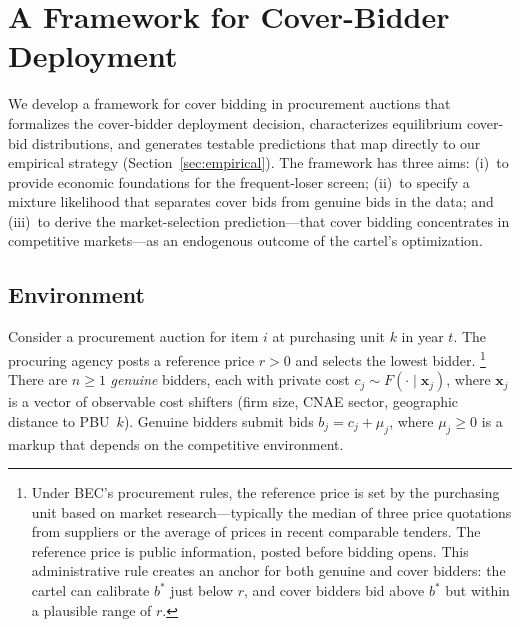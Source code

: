 
\section{A Framework for Cover-Bidder Deployment}
\label{sec:structural}

We develop a framework for cover bidding in procurement auctions
that formalizes the cover-bidder deployment decision, characterizes
equilibrium cover-bid distributions, and generates testable predictions
that map directly to our empirical strategy
(Section~\ref{sec:empirical}). The framework has three aims: (i)~to
provide economic foundations for the frequent-loser screen; (ii)~to
specify a mixture likelihood that separates cover bids from genuine bids
in the data; and (iii)~to derive the market-selection prediction---that
cover bidding concentrates in competitive markets---as an endogenous
outcome of the cartel's optimization.


\subsection{Environment}
\label{sec:environment}

Consider a procurement auction for item $i$ at purchasing unit $k$ in
year $t$. The procuring agency posts a reference price $r > 0$ and
selects the lowest bidder.%
\footnote{Under BEC's procurement rules, the reference price is %
set by the purchasing unit based on market research---typically
the median of three price quotations from suppliers or the
average of prices in recent comparable tenders. The reference
price is public information, posted before bidding opens. This
administrative rule creates an anchor for both genuine and
cover bidders: the cartel can calibrate $b^*$ just below $r$,
and cover bidders bid above $b^*$ but within a plausible range
of $r$.} There are $n \geq 1$ \emph{genuine} bidders,
each with private cost $c_j \sim F(\cdot \mid \mathbf{x}_j)$, where
$\mathbf{x}_j$ is a vector of observable cost shifters (firm size, CNAE
sector, geographic distance to PBU~$k$). Genuine bidders submit bids
$b_j = c_j + \mu_j$, where $\mu_j \geq 0$ is a markup that depends on
the competitive environment.

